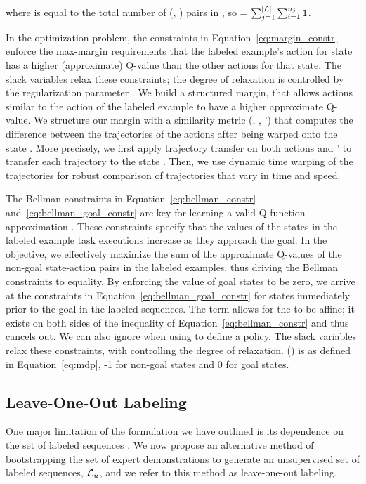 where  is equal to the total number of
(\statevar{}, \actionvar{}) pairs in , so  = 
$\sum_{j=1}^{|\mathcal{L}|{}} \sum_{i=1}^{n_{j}} 1$.

In the optimization problem, the constraints in Equation~\ref{eq:margin_constr}
enforce the max-margin requirements that the
labeled example's action  for state 
has a higher (approximate) Q-value than the other actions for that
state. The slack variables  relax these constraints;
the degree of relaxation is controlled by the regularization parameter \marginslackc{}.
We build a structured margin, that allows actions similar to the
action of the labeled example to have a higher approximate Q-value.
We structure our margin with a similarity metric
\marginvar{}(, , \actionvar{}') that computes
the difference between the trajectories of the actions after being warped onto
the state . More precisely, we first apply trajectory
transfer on both actions  and \actionvar{}' to transfer
each trajectory to the state . Then, we use dynamic
time warping of the trajectories for robust comparison of trajectories that
vary in time and speed. 

The Bellman constraints in Equation~\ref{eq:bellman_constr} and~\ref{eq:bellman_goal_constr}
are key for learning a valid Q-function approximation \approxq. These constraints specify that
the values of the states in the labeled example task executions increase as they
approach the goal. In the objective, we effectively maximize the sum of the
approximate Q-values of the non-goal state-action pairs in the labeled examples,
thus driving the Bellman constraints to equality. By enforcing the value of goal states
to be zero, we arrive at the constraints in Equation~\ref{eq:bellman_goal_constr} for
states immediately prior to the goal in the labeled sequences.
The \weightszero{} term allows for the \approxq{} to be affine; it exists on
both sides of the inequality of Equation~\ref{eq:bellman_constr} and thus cancels out.
We can also ignore \weightszero{} when using \approxq{} to define a policy. The slack variables
 relax these constraints, with \bellmanslackc{} controlling
the degree of relaxation.
\rewardfn{}(\statevar{}) is as defined in Equation~\ref{eq:mdp},
-1 for non-goal states and 0 for goal states.

\subsection{Leave-One-Out Labeling}
\label{subsec:lool}
One major limitation of the formulation we have outlined is its dependence on
the set of labeled sequences . We now propose an alternative method
of bootstrapping the set of expert demonstrations \demoset{} to generate an
unsupervised set of labeled sequences, $\mathcal{L}{}_u$, and we refer to this
method as leave-one-out labeling.

